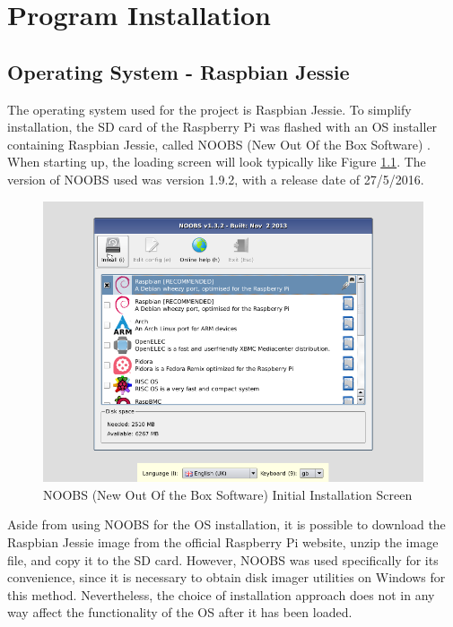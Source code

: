 \chapter{Program Installation}

\section{Operating System - Raspbian Jessie}
\label{appraspbianjessie}

The operating system used for the project is Raspbian Jessie. To simplify installation, the SD card of the Raspberry Pi was flashed with an OS installer containing Raspbian Jessie, called NOOBS (New Out Of the Box Software) \cite{rpi3noobs}. When starting up, the loading screen will look typically like Figure \ref{rpi3noobs}. The version of NOOBS used was version 1.9.2, with a release date of 27/5/2016. 

\begin{figure}[H]
	\centering
	\includegraphics[width=\linewidth]{noobs.png}
	\caption{NOOBS (New Out Of the Box Software) Initial Installation Screen \cite{rpi3noobs}}
	\label{rpi3noobs}
\end{figure}

Aside from using NOOBS for the OS installation, it is possible to download the Raspbian Jessie image from the official Raspberry Pi website, unzip the image file, and copy it to the SD card. However, NOOBS was used specifically for its convenience, since it is necessary to obtain disk imager utilities on Windows for this method. Nevertheless, the choice of installation approach does not in any way affect the functionality of the OS after it has been loaded.  







